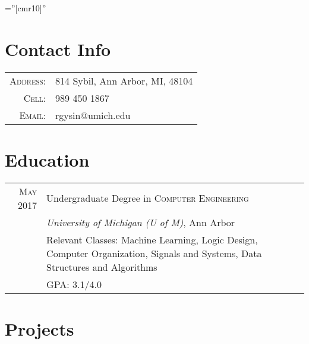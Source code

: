 \documentclass[a4paper,10pt]{article} %
\begin{document}
\pagestyle{empty} %

\font\fb=''[cmr10]'' %


\par{\bigskip\par} %

\section{Contact Info}

\begin{tabular}{rl}
\textsc{Address:} & 814 Sybil, Ann Arbor, MI, 48104 \\
\textsc{Cell:} & 989 450 1867\\
\textsc{Email:} & rgysin@umich.edu
\end{tabular}


\section{Education}

\begin{tabular}{r|p{12cm}}
\textsc{May} 2017\space\space& Undergraduate Degree in \textsc{Computer Engineering} \\
& \normalsize\emph{University of Michigan (U of M)}, Ann Arbor \\
& \footnotesize{Relevant Classes: Machine Learning, Logic Design, Computer Organization, Signals and Systems, Data Structures and Algorithms} \\
& \footnotesize{GPA: 3.1/4.0} \\
\end{tabular}


\section{Projects}
\end{document}
